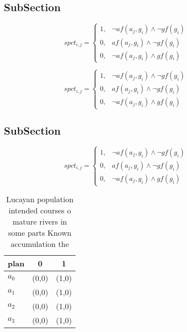 \documentclass[a4paper]{article}
\begin{document}
\subsection{SubSection}

\begin{equation}
spct_{i,j} =
\begin{cases}
1, & \text{$\neg af(a_j,g_i) \wedge \neg gf(g_i)$}\\
0, & \text{$af(a_j,g_i) \wedge \neg gf(g_i)$}\\
0, & \text{$\neg af(a_j,g_i) \wedge gf(g_i)$}
\end{cases}
\end{equation}

\begin{equation}
spct_{i,j} =
\begin{cases}
1, & \text{$\neg af(a_j,g_i) \wedge \neg gf(g_i)$}\\
0, & \text{$af(a_j,g_i) \wedge \neg gf(g_i)$}\\
0, & \text{$\neg af(a_j,g_i) \wedge gf(g_i)$}
\end{cases}
\end{equation}

\subsection{SubSection}

\begin{equation}
spct_{i,j} =
\begin{cases}
1, & \text{$\neg af(a_j,g_i) \wedge \neg gf(g_i)$}\\
0, & \text{$af(a_j,g_i) \wedge \neg gf(g_i)$}\\
0, & \text{$\neg af(a_j,g_i) \wedge gf(g_i)$}
\end{cases}
\end{equation}

\begin{table}
\begin{adjustbox}{width=1\columnwidth}
\begin{tabular}{|l|l|l|}
\hline
\textbf{plan} & \multicolumn{1}{c|}{\textbf{0}} & \multicolumn{1}{c|}{\textbf{1}} \\ \hline
\textbf{$a_0$}  & (0,0) & (1,0) \\ \hline
\textbf{$a_1$}  & (0,0) & (1,0) \\ \hline
\textbf{$a_2$}  & (0,0) & (1,0) \\ \hline
\textbf{$a_3$}  & (0,0) & (1,0) \\ \hline
\end{tabular}
\end{adjustbox}
\caption{Lucayan population intended courses o mature rivers in some parts Known accumulation the 
}
\end{table}
\end{document}
